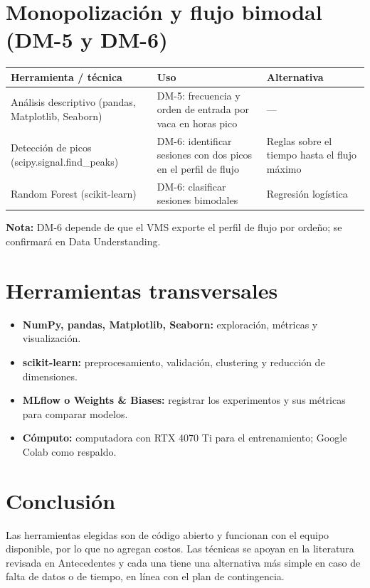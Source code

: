\documentclass[11pt,letterpaper,DIV=12]{scrartcl}
\begin{document}
\section{Monopolización y flujo bimodal (DM-5 y DM-6)}

\noindent
\begin{tabularx}{\textwidth}{>{\raggedright\arraybackslash}X>{\raggedright\arraybackslash}X>{\raggedright\arraybackslash}X}
  \toprule
  Herramienta / técnica & Uso & Alternativa \\
  \midrule
  Análisis descriptivo (pandas, Matplotlib, Seaborn) & DM-5: frecuencia y orden de entrada por vaca en horas pico & --- \\
  \addlinespace
  Detección de picos (scipy.signal.find\_peaks) & DM-6: identificar sesiones con dos picos en el perfil de flujo & Reglas sobre el tiempo hasta el flujo máximo \\
  \addlinespace
  Random Forest (scikit-learn) & DM-6: clasificar sesiones bimodales & Regresión logística \\
  \bottomrule
\end{tabularx}

\medskip

\textbf{Nota:} DM-6 depende de que el VMS exporte el perfil de flujo por ordeño; se confirmará en Data Understanding.

\section{Herramientas transversales}

\begin{itemize}
  \item \textbf{NumPy, pandas, Matplotlib, Seaborn:} exploración, métricas y visualización.
  \item \textbf{scikit-learn:} preprocesamiento, validación, clustering y reducción de dimensiones.
  \item \textbf{MLflow o Weights \& Biases:} registrar los experimentos y sus métricas para comparar modelos.
  \item \textbf{Cómputo:} computadora con RTX 4070 Ti para el entrenamiento; Google Colab como respaldo.
\end{itemize}

\section{Conclusión}

Las herramientas elegidas son de código abierto y funcionan con el equipo disponible, por lo que no agregan costos. Las técnicas se apoyan en la literatura revisada en Antecedentes y cada una tiene una alternativa más simple en caso de falta de datos o de tiempo, en línea con el plan de contingencia.

\printbibliography
\end{document}
